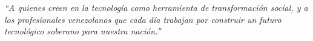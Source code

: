\thispagestyle{empty}
\vspace*{3cm}

\begin{center}
\textit{
``A quienes creen en la tecnología como herramienta de transformación social,
y a los profesionales venezolanos que cada día trabajan por construir
un futuro tecnológico soberano para nuestra nación.''}
\end{center}

\vspace{3cm}

\newpage
